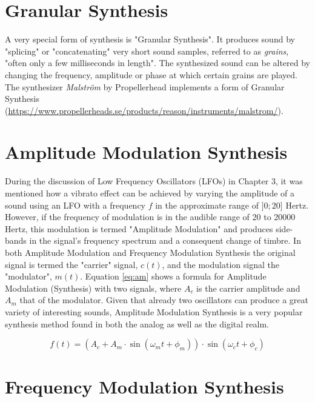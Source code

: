 \section{Granular Synthesis}

A very special form of synthesis is "Granular Synthesis". It produces sound by "splicing" or "concatenating" very short sound samples, referred to as \emph{grains}, "often only a few milliseconds in length".  The synthesized sound can be altered by changing the frequency, amplitude or phase at which certain grains are played. The synthesizer \emph{Malstr{\"o}m} by Propellerhead implements a form of Granular Synthesis (\url{https://www.propellerheads.se/products/reason/instruments/malstrom/}).

\section{Amplitude Modulation Synthesis}

During the discussion of Low Frequency Oscillators (LFOs) in Chapter 3, it was mentioned how a vibrato effect can be achieved by varying the amplitude of a sound using an LFO with a frequency $f$ in the approximate range of $]0;20]$ Hertz. However, if the frequency of modulation is in the audible range of 20 to 20000 Hertz, this modulation is termed "Amplitude Modulation" and produces side-bands in the signal's frequency spectrum and a consequent change of timbre. In both Amplitude Modulation and Frequency Modulation Synthesis the original signal is termed the "carrier" signal, $c(t)$, and the modulation signal the "modulator", $m(t)$. Equation \ref{eq:am} shows a formula for Amplitude Modulation (Synthesis) with two signals, where $A_{c}$ is the carrier amplitude and $A_{m}$ that of the modulator. Given that already two oscillators can produce a great variety of interesting sounds, Amplitude Modulation Synthesis is a very popular synthesis method found in both the analog as well as the digital realm.

\begin{equation}
  f(t) = (A_{c} + A_{m}\cdot\sin(\omega_{m} t + \phi_{m}))\cdot\sin(\omega_{c} t + \phi_{c})
  \label{eq:am}
\end{equation}

\section{Frequency Modulation Synthesis}

